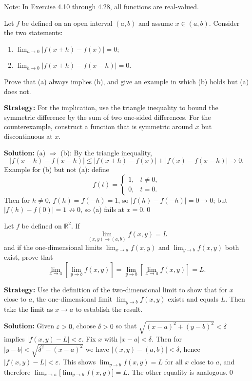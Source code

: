 Note: In Exercise 4.10 through 4.28, all functions are real-valued.



\begin{problembox}
Let $f$ be defined on an open interval $(a, b)$ and assume $x \in (a, b)$. Consider the two statements:
\begin{enumerate}[label=(\alph*)]
\item $\lim_{h \to 0} |f(x + h) - f(x)| = 0$;
\item $\lim_{h \to 0} |f(x + h) - f(x - h)| = 0$.
\end{enumerate}
Prove that (a) always implies (b), and give an example in which (b) holds but (a) does not.
\end{problembox}

\noindent\textbf{Strategy:} For the implication, use the triangle inequality to bound the symmetric difference by the sum of two one-sided differences. For the counterexample, construct a function that is symmetric around $x$ but discontinuous at $x$.

\bigskip\noindent\textbf{Solution:}
(a) $\Rightarrow$ (b): By the triangle inequality,
\[
|f(x+h)-f(x-h)|\le |f(x+h)-f(x)|+|f(x)-f(x-h)|\to 0.
\]
Example for (b) but not (a): define
\[
f(t)=\begin{cases}
1,& t\ne 0,\\
0,& t=0.
\end{cases}
\]
Then for $h\ne 0$, $f(h)=f(-h)=1$, so $|f(h)-f(-h)|=0\to 0$; but $|f(h)-f(0)|=1\not\to 0$, so (a) fails at $x=0$.\qed



\begin{problembox}
Let $f$ be defined on $\mathbb{R}^2$. If
\[\lim_{(x, y) \to (a, b)} f(x, y) = L\]
and if the one-dimensional limits $\lim_{x \to a} f(x, y)$ and $\lim_{y \to b} f(x, y)$ both exist, prove that
\[\lim_{x \to a} \left[ \lim_{y \to b} f(x, y) \right] = \lim_{y \to b} \left[ \lim_{x \to a} f(x, y) \right] = L.\]
\end{problembox}

\noindent\textbf{Strategy:} Use the definition of the two-dimensional limit to show that for $x$ close to $a$, the one-dimensional limit $\lim_{y \to b} f(x, y)$ exists and equals $L$. Then take the limit as $x \to a$ to establish the result.

\bigskip\noindent\textbf{Solution:}
Given $\varepsilon>0$, choose $\delta>0$ so that $\sqrt{(x-a)^2+(y-b)^2}<\delta$ implies $|f(x,y)-L|<\varepsilon$. Fix $x$ with $|x-a|<\delta$. Then for $|y-b|<\sqrt{\delta^2-(x-a)^2}$ we have $|(x,y)-(a,b)|<\delta$, hence $|f(x,y)-L|<\varepsilon$. This shows $\lim_{y\to b}f(x,y)=L$ for all $x$ close to $a$, and therefore $\lim_{x\to a}\big[\lim_{y\to b}f(x,y)\big]=L$. The other equality is analogous.\qed



